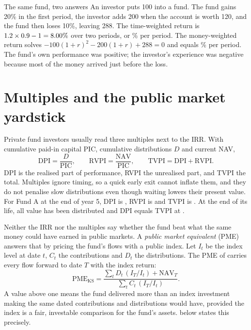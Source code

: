 \begin{chapterrefs}
\begin{example}{The same fund, two answers}\label{ex:twr}
An investor puts 100 into a fund. The fund gains 20\% in the first period, the investor adds 200 when
the account is worth 120, and the fund then loses 10\%, leaving 288. The time-weighted return is
$1.2\times 0.9 - 1 = 8.00\%$ over two periods, or \twrPer\% per period. The money-weighted return
solves $-100(1+r)^2 - 200(1+r) + 288 = 0$ and equals \dwrPer\% per period. The fund's own performance was
positive; the investor's experience was negative because most of the money arrived just before the
loss.
\end{example}

\FloatBarrier
\section{Multiples and the public market yardstick}
\label{sec:multiples}

Private fund investors usually read three multiples next to the IRR. With cumulative paid-in capital
$\mathrm{PIC}$, cumulative distributions $D$ and current NAV,
\begin{equation}\label{eq:multiples}
  \mathrm{DPI} = \frac{D}{\mathrm{PIC}},\qquad
  \mathrm{RVPI} = \frac{\mathrm{NAV}}{\mathrm{PIC}},\qquad
  \mathrm{TVPI} = \mathrm{DPI} + \mathrm{RVPI} .
\end{equation}
DPI is the realised part of performance, RVPI the unrealised part, and TVPI the total. Multiples
ignore timing, so a quick early exit cannot inflate them, and they do not penalise slow
distributions even though waiting lowers their present value. For Fund A at the end of year 5, DPI is \dpiFive, RVPI is \rvpiFive{} and TVPI is \tvpiFive. At
the end of its life, all value has been distributed and DPI equals TVPI at \tvpiEnd.

Neither the IRR nor the multiples say whether the fund beat what the same money could have earned in
public markets. A \emph{public market equivalent} (PME) answers that by pricing the fund's flows with
a public index. Let $I_t$ be the index level at date $t$, $C_t$ the contributions and $D_t$ the
distributions. The PME of \textcite{kaplan2005} carries every flow forward to date $T$
with the index return:
\begin{equation}\label{eq:kspme}
  \mathrm{PME}_{\mathrm{KS}} = \frac{\sum_t D_t\,(I_T/I_t) + \mathrm{NAV}_T}{\sum_t C_t\,(I_T/I_t)} .
\end{equation}
A value above one means the fund delivered more than an index investment making the same dated
contributions and distributions would have, provided the index is a fair, investable comparison for
the fund's assets.
 below states this precisely.


\end{chapterrefs}
